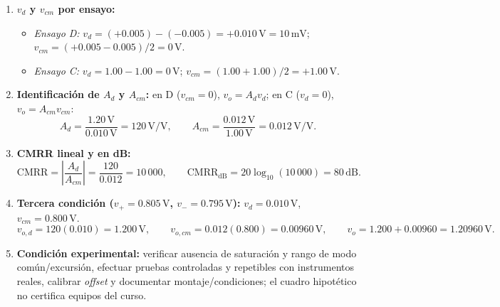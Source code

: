 \documentclass[10pt, a4paper]{article}
\begin{document}
\begin{enumerate}
    \setlength{\itemsep}{2pt}
    \item \textbf{$v_d$ y $v_{cm}$ por ensayo:}
    \begin{itemize}
        \setlength{\itemsep}{1pt}
        \item \textit{Ensayo D:} $v_d = (+0.005) - (-0.005) = +0.010\,\mathrm{V} = 10\,\mathrm{mV}$; $v_{cm} = (+0.005 - 0.005)/2 = 0\,\mathrm{V}$.
        \item \textit{Ensayo C:} $v_d = 1.00 - 1.00 = 0\,\mathrm{V}$; $v_{cm} = (1.00 + 1.00)/2 = +1.00\,\mathrm{V}$.
    \end{itemize}
    \item \textbf{Identificación de $A_d$ y $A_{cm}$:} en D ($v_{cm}=0$), $v_o = A_d v_d$; en C ($v_d=0$), $v_o = A_{cm} v_{cm}$:
    \begin{equation}
        A_d = \frac{1.20\,\mathrm{V}}{0.010\,\mathrm{V}} = 120\,\mathrm{V/V}, \qquad
        A_{cm} = \frac{0.012\,\mathrm{V}}{1.00\,\mathrm{V}} = 0.012\,\mathrm{V/V}.
    \end{equation}
    \item \textbf{CMRR lineal y en dB:}
    \begin{equation}
        \mathrm{CMRR} = \left|\frac{A_d}{A_{cm}}\right| = \frac{120}{0.012} = 10\,000, \qquad
        \mathrm{CMRR}_{\mathrm{dB}} = 20\log_{10}(10\,000) = 80\,\mathrm{dB}.
    \end{equation}
    \item \textbf{Tercera condición ($v_+ = 0.805\,\mathrm{V}$, $v_- = 0.795\,\mathrm{V}$):} $v_d = 0.010\,\mathrm{V}$, $v_{cm} = 0.800\,\mathrm{V}$.
    \begin{equation}
        v_{o,d} = 120(0.010) = 1.200\,\mathrm{V}, \qquad
        v_{o,cm} = 0.012(0.800) = 0.00960\,\mathrm{V}, \qquad
        v_o = 1.200 + 0.00960 = 1.20960\,\mathrm{V}.
    \end{equation}
    \item \textbf{Condición experimental:} verificar ausencia de saturación y rango de modo común/excursión, efectuar pruebas controladas y repetibles con instrumentos reales, calibrar \textit{offset} y documentar montaje/condiciones; el cuadro hipotético no certifica equipos del curso.
\end{enumerate}
\end{document}
